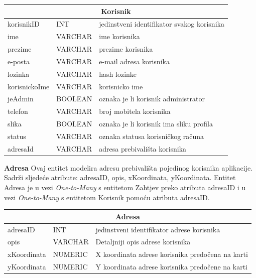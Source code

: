 			\begin{tabularx} {\textwidth} {|p{3.5cm}|p{2cm}|X|}
				
				\hline
				\multicolumn{3}{|c|}{\textbf{Korisnik}} \\
				\hline
				
				
				\cellcolor{LightGreen}korisnikID & INT	&   jedinstveni identifikator svakog korisnika 	\\ \hline
				ime	& VARCHAR &   ime korisnika	\\ \hline 
				prezime & VARCHAR &  prezime korisnika \\ \hline 
				e-posta & VARCHAR	&  	e-mail adresa korisnika	\\ \hline 
				lozinka & VARCHAR	&  	hash lozinke	\\ \hline
				korisnickoIme & VARCHAR	&  	korisnicko ime	\\ \hline
				jeAdmin & BOOLEAN	&  	oznaka je li korisnik administrator	\\ \hline
				telefon & VARCHAR	&  	broj mobitela korisnika	\\ \hline
				slika & BOOLEAN	&  	oznaka je li korisnik ima sliku profila	\\ \hline
				status & VARCHAR	&  	oznaka statusa korisničkog računa	\\ \hline
				\cellcolor{LightBlue}adresaId & VARCHAR	&  	adresa prebivališta korisnika	\\ \hline
				
				
				
			\end{tabularx} 
			
			\bigskip
			\bigskip
			\textbf{Adresa} Ovaj entitet modelira adresu prebivališta pojedinog korisnika aplikacije.
			Sadrži sljedeće atribute: adresaID, opis, xKoordinata, yKoordinata. Entitet Adresa je u vezi \textit{One-to-Many} s entitetom Zahtjev preko atributa adresaID i u vezi \textit{One-to-Many} s entitetom Korisnik pomoću atributa adresaID.
			\bigskip
			
			
			\begin{tabularx} {\textwidth} {|p{3.5cm}|p{2cm}|X|}
				
				\hline
				\multicolumn{3}{|c|}{\textbf{Adresa}} \\
				\hline
				
				\cellcolor{LightGreen}adresaID & INT	& jedinstveni identifikator adrese korisnika	\\ \hline 
				opis & VARCHAR & Detaljniji opis adrese korisnika  \\ \hline 
				xKoordinata & NUMERIC	& X koordinata adrese korisnika predočena na karti	\\ \hline 
				yKoordinata & NUMERIC	& Y koordinata adrese korisnika predočene na karti		\\ \hline
				
				
				
			\end{tabularx}
			

